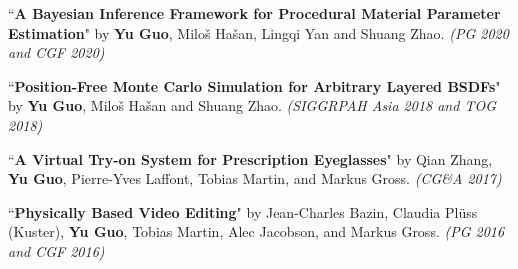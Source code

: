 \documentclass[margin,line]{resume}
\begin{document}
\begin{resume}
	\vspace{-5mm}
	
	``\textbf{A Bayesian Inference Framework for Procedural Material Parameter Estimation}" 
	by \textbf{Yu Guo}, Milo\v{s} Ha\v{s}an, Lingqi Yan and Shuang Zhao. 
	\textsl{(PG 2020 and CGF 2020)}\\
	
	\vspace{-5mm}
	
	``\textbf{Position-Free Monte Carlo Simulation for Arbitrary Layered BSDFs}" 
	by \textbf{Yu Guo}, Milo\v{s} Ha\v{s}an and Shuang Zhao. 
	\textsl{(SIGGRPAH Asia 2018 and TOG 2018)}\\
	
	\vspace{-5mm}
	
	``\textbf{A Virtual Try-on System for Prescription Eyeglasses}" 
	by Qian Zhang, \textbf{Yu Guo}, Pierre-Yves Laffont, Tobias Martin, and Markus Gross. 
	\textsl{(CG\&A 2017)}\\
	
	\vspace{-5mm}
	
%	
	
	``\textbf{Physically Based Video Editing}" 
	by Jean-Charles Bazin, Claudia Pl\"{u}ss (Kuster), \textbf{Yu Guo}, Tobias Martin, Alec Jacobson, and Markus Gross. 
	\textsl{(PG 2016 and CGF 2016)}\\
	
	\vspace{-5mm}
	
%	
%	
%	
	

\end{resume}
\end{document}
